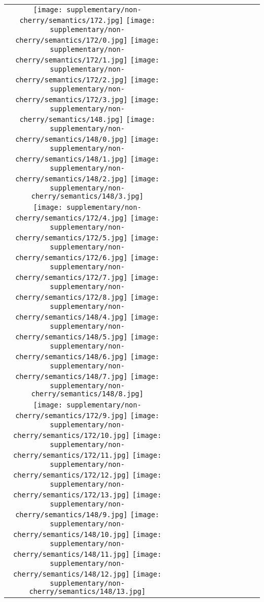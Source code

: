 \begin{figure*}[tb!]
    \centering
    \setlength{\tabcolsep}{0.5pt}
    {\small
    \renewcommand{\arraystretch}{0.5} 
    \begin{tabular}{c c c c c c c c c c c c }
    \captionsetup{type=figure, font=scriptsize}
  \texttt{[image: supplementary/non-cherry/semantics/172.jpg]}
  \texttt{[image: supplementary/non-cherry/semantics/172/0.jpg]}
  \texttt{[image: supplementary/non-cherry/semantics/172/1.jpg]}
  \texttt{[image: supplementary/non-cherry/semantics/172/2.jpg]}
  \texttt{[image: supplementary/non-cherry/semantics/172/3.jpg]}
    \hspace{5mm}
      \texttt{[image: supplementary/non-cherry/semantics/148.jpg]}
  \texttt{[image: supplementary/non-cherry/semantics/148/0.jpg]}
  \texttt{[image: supplementary/non-cherry/semantics/148/1.jpg]}
  \texttt{[image: supplementary/non-cherry/semantics/148/2.jpg]}
  \texttt{[image: supplementary/non-cherry/semantics/148/3.jpg]}

 \tabularnewline
  \texttt{[image: supplementary/non-cherry/semantics/172/4.jpg]}
  \texttt{[image: supplementary/non-cherry/semantics/172/5.jpg]}
  \texttt{[image: supplementary/non-cherry/semantics/172/6.jpg]}
  \texttt{[image: supplementary/non-cherry/semantics/172/7.jpg]}
  \texttt{[image: supplementary/non-cherry/semantics/172/8.jpg]}
    \hspace{5mm}
  \texttt{[image: supplementary/non-cherry/semantics/148/4.jpg]}
  \texttt{[image: supplementary/non-cherry/semantics/148/5.jpg]}
  \texttt{[image: supplementary/non-cherry/semantics/148/6.jpg]}
  \texttt{[image: supplementary/non-cherry/semantics/148/7.jpg]}
  \texttt{[image: supplementary/non-cherry/semantics/148/8.jpg]}
\tabularnewline
  \texttt{[image: supplementary/non-cherry/semantics/172/9.jpg]}
  \texttt{[image: supplementary/non-cherry/semantics/172/10.jpg]}
  \texttt{[image: supplementary/non-cherry/semantics/172/11.jpg]}
  \texttt{[image: supplementary/non-cherry/semantics/172/12.jpg]}
  \texttt{[image: supplementary/non-cherry/semantics/172/13.jpg]}
    \hspace{5mm}
  \texttt{[image: supplementary/non-cherry/semantics/148/9.jpg]}
  \texttt{[image: supplementary/non-cherry/semantics/148/10.jpg]}
  \texttt{[image: supplementary/non-cherry/semantics/148/11.jpg]}
  \texttt{[image: supplementary/non-cherry/semantics/148/12.jpg]}
  \texttt{[image: supplementary/non-cherry/semantics/148/13.jpg]}


\end{tabular}}
\end{figure*}
